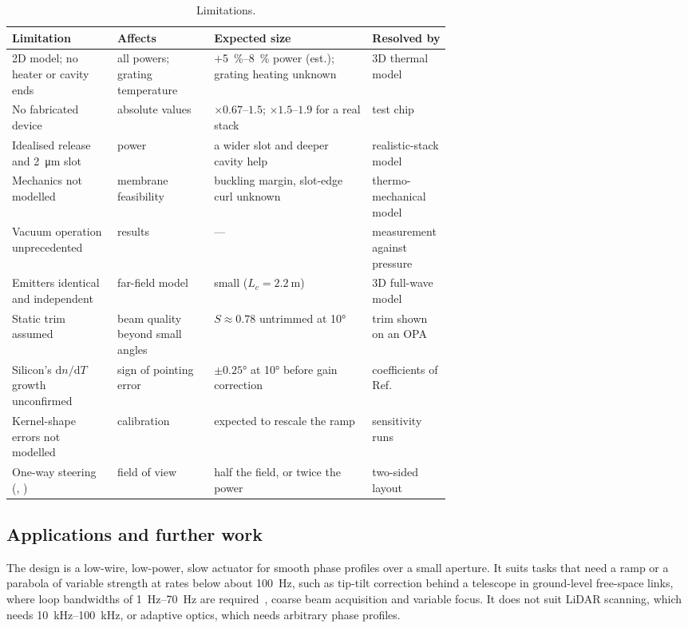 \begin{table}[htbp]
  \centering
  \caption{Limitations.}
  \label{tab:limits}
  \footnotesize
  \begin{tabularx}{\linewidth}{@{}P{0.24\linewidth}P{0.22\linewidth}LP{0.18\linewidth}@{}}
    \toprule
    Limitation & Affects & Expected size & Resolved by \\
    \midrule
    2D model; no heater or cavity ends & all powers; grating temperature & $+$\qtyrange{5}{8}{\percent} power (est.);
        grating heating unknown & 3D thermal model \\
    No fabricated device & absolute values & $\times0.67$--$1.5$; $\times1.5$--$1.9$ for a real stack & test chip \\
    Idealised release and \qty{2}{\micro\metre} slot &  power & a wider slot and deeper cavity help &
        realistic-stack model \\
    Mechanics not modelled & membrane feasibility & buckling margin, slot-edge curl unknown & thermo-mechanical
        model \\
    Vacuum operation unprecedented &  results & --- & measurement against pressure \\
    Emitters identical and independent & far-field model & small ($L_c=\qty{2.2}{\metre}$) & 3D full-wave model \\
    Static trim assumed & beam quality beyond small angles & $S\approx0.78$ untrimmed at \ang{10} & trim shown on
        an OPA \\
    Silicon's $\mathrm{d}n/\mathrm{d}T$ growth unconfirmed & sign of pointing error & $\pm\ang{0.25}$ at \ang{10}
        before gain correction & coefficients of Ref.~\cite{cocorullo1999} \\
    Kernel-shape errors not modelled & calibration & expected to rescale the ramp & sensitivity runs \\
    One-way steering (, ) & field of view & half the field, or twice the power &
        two-sided layout \\
    \bottomrule
  \end{tabularx}
\end{table}

\subsection{Applications and further work}

The design is a low-wire, low-power, slow actuator for smooth phase profiles over a small aperture. It suits tasks
that need a ramp or a parabola of variable strength at rates below about \qty{100}{\hertz}, such as tip-tilt
correction behind a telescope in ground-level free-space links, where loop bandwidths of \qtyrange{1}{70}{\hertz} are
required~\cite{frost2024}, coarse beam acquisition and variable focus. It does not suit LiDAR scanning, which needs
\qtyrange{10}{100}{\kilo\hertz}, or adaptive optics, which needs arbitrary phase profiles.

